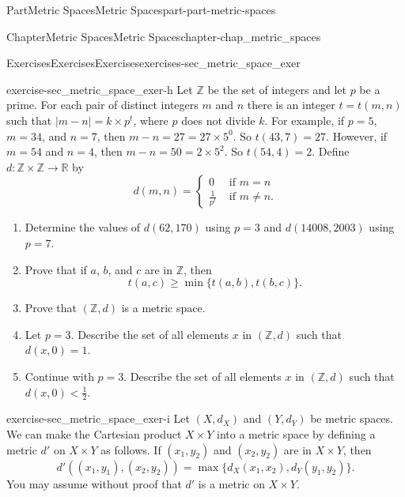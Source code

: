 \documentclass[oneside,10pt,]{book}
\numberwithin{equation}{chapter}
\newcommand{\Z}{\mathbb{Z}}
\newcommand{\R}{\mathbb{R}}
\newcommand{\lt}{<}
\newcommand{\amp}{&}
\begin{document}
\begin{partptx}{Part}{Metric Spaces}{}{Metric Spaces}{}{}{part-part-metric-spaces}
\begin{chapterptx}{Chapter}{Metric Spaces}{}{Metric Spaces}{}{}{chapter-chap_metric_spaces}
\begin{exercises-section}{Exercises}{Exercises}{}{Exercises}{}{}{exercises-sec_metric_space_exer}
\begin{divisionexercise}{8}{}{}{exercise-sec_metric_space_exer-h}%
Let \(\Z\) be the set of integers and let \(p\) be a prime. For each pair of distinct integers \(m\) and \(n\) there is an integer \(t = t(m,n)\) such that \(|m-n| = k \times p^t\), where \(p\) does not divide \(k\). For example, if \(p=5\), \(m = 34\), and \(n = 7\), then \(m-n = 27 = 27 \times 5^0\). So \(t(43,7) = 27\). However, if \(m = 54\) and \(n = 4\), then \(m-n = 50 = 2 \times 5^2\). So \(t(54,4) = 2\). Define \(d: \Z \times \Z \to \R\) by%
\begin{equation*}
d(m,n) = \begin{cases}0 \amp \text{ if }  m=n \\ \frac{1}{p^t} \amp \text{ if }  m \neq n. \end{cases}
\end{equation*}
%
\begin{enumerate}[font=\bfseries,label=(\alph*),ref=\alph*]%
\item{}Determine the values of \(d(62,170)\) using \(p=3\) and \(d(14008,2003)\) using \(p=7\).%
\item{}Prove that if \(a\), \(b\), and \(c\) are in \(\Z\), then%
\begin{equation*}
t(a,c) \geq \min\{t(a,b), t(b,c)\}\text{.}
\end{equation*}
%
\item{}Prove that \((\Z,d)\) is a metric space.%
\item{}Let \(p = 3\). Describe the set of all elements \(x\) in \((\Z,d)\) such that \(d(x,0) = 1\).%
\item{}Continue with \(p=3\). Describe the set of all elements \(x\) in \((\Z,d)\) such that \(d(x,0) \lt \frac{1}{2}\).%
\end{enumerate}%
\end{divisionexercise}%
\begin{divisionexercise}{9}{}{}{exercise-sec_metric_space_exer-i}%
Let \((X, d_X)\) and \((Y, d_Y)\) be metric spaces. We can make the Cartesian product \(X \times Y\) into a metric space by defining a metric \(d'\) on \(X \times Y\) as follows. If \((x_1, y_2)\) and \((x_2, y_2)\) are in \(X \times Y\), then%
\begin{equation*}
d'((x_1,y_1), (x_2, y_2)) = \max\{d_X(x_1,x_2), d_Y(y_1,y_2)\}\text{.}
\end{equation*}
You may assume without proof that \(d'\) is a metric on \(X \times Y\).%
\begin{enumerate}[font=\bfseries,label=(\alph*),ref=\alph*]%

\end{enumerate}
\end{divisionexercise}
\end{exercises-section}
\end{chapterptx}
\end{partptx}
\end{document}
